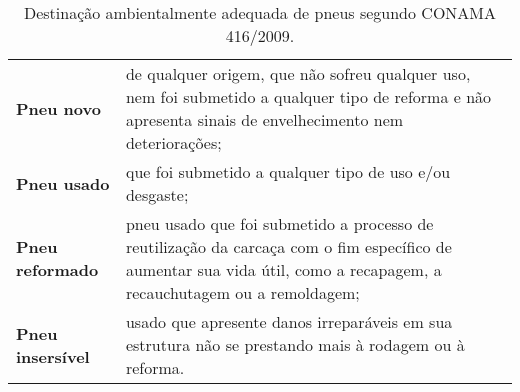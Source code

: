 \begin{table}[htbp]
  \centering
  \caption{Destinação ambientalmente adequada de pneus segundo CONAMA 416/2009.}
    \begin{tabular}{p{7.43em}|p{28.855em}}
    \rowcolor[rgb]{ .984,  .831,  .706} \textbf{Pneu novo} & de qualquer origem, que não sofreu qualquer uso, nem foi submetido a qualquer tipo de reforma e não apresenta sinais de envelhecimento nem deteriorações; \\
    \rowcolor[rgb]{ .992,  .914,  .851} \textbf{Pneu usado} & que foi submetido a qualquer tipo de uso e/ou desgaste; \\
    \rowcolor[rgb]{ .984,  .831,  .706} \textbf{Pneu reformado} & pneu usado que foi submetido a processo de reutilização da carcaça com o fim específico de aumentar sua vida útil, como a recapagem, a recauchutagem ou a remoldagem; \\
    \rowcolor[rgb]{ .992,  .914,  .851} \textbf{Pneu insersível} & usado que apresente danos irreparáveis em sua estrutura não se prestando mais à rodagem ou à reforma. \\
    \end{tabular}%
  \label{tab:destinacao_pneus}%
\end{table}%

